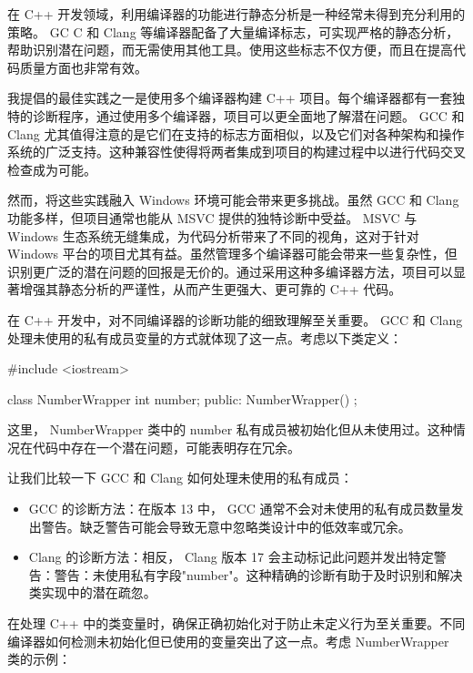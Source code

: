 
在 C++ 开发领域，利用编译器的功能进行静态分析是一种经常未得到充分利用的策略。 GC C 和 Clang 等编译器配备了大量编译标志，可实现严格的静态分析，帮助识别潜在问题，而无需使用其他工具。使用这些标志不仅方便，而且在提高代码质量方面也非常有效。

我提倡的最佳实践之一是使用多个编译器构建 C++ 项目。每个编译器都有一套独特的诊断程序，通过使用多个编译器，项目可以更全面地了解潜在问题。 GCC 和 Clang 尤其值得注意的是它们在支持的标志方面相似，以及它们对各种架构和操作系统的广泛支持。这种兼容性使得将两者集成到项目的构建过程中以进行代码交叉检查成为可能。

然而，将这些实践融入 Windows 环境可能会带来更多挑战。虽然 GCC 和 Clang 功能多样，但项目通常也能从 MSVC 提供的独特诊断中受益。 MSVC 与 Windows 生态系统无缝集成，为代码分析带来了不同的视角，这对于针对 Windows 平台的项目尤其有益。虽然管理多个编译器可能会带来一些复杂性，但识别更广泛的潜在问题的回报是无价的。通过采用这种多编译器方法，项目可以显著增强其静态分析的严谨性，从而产生更强大、更可靠的 C++ 代码。


在 C++ 开发中，对不同编译器的诊断功能的细致理解至关重要。 GCC 和 Clang 处理未使用的私有成员变量的方式就体现了这一点。考虑以下类定义：

\begin{cpp}
#include <iostream>

class NumberWrapper {
    int number;
    public:
    NumberWrapper() {
    }
};
\end{cpp}

这里， NumberWrapper 类中的 number 私有成员被初始化但从未使用过。这种情况在代码中存在一个潜在问题，可能表明存在冗余。

让我们比较一下 GCC 和 Clang 如何处理未使用的私有成员：

\begin{itemize}
\item
GCC 的诊断方法：在版本 13 中， GCC 通常不会对未使用的私有成员数量发出警告。缺乏警告可能会导致无意中忽略类设计中的低效率或冗余。

\item
Clang 的诊断方法：相反， Clang 版本 17 会主动标记此问题并发出特定警告：警告：未使用私有字段"number"。这种精确的诊断有助于及时识别和解决类实现中的潜在疏忽。
\end{itemize}


在处理 C++ 中的类变量时，确保正确初始化对于防止未定义行为至关重要。不同编译器如何检测未初始化但已使用的变量突出了这一点。考虑 NumberWrapper 类的示例：

